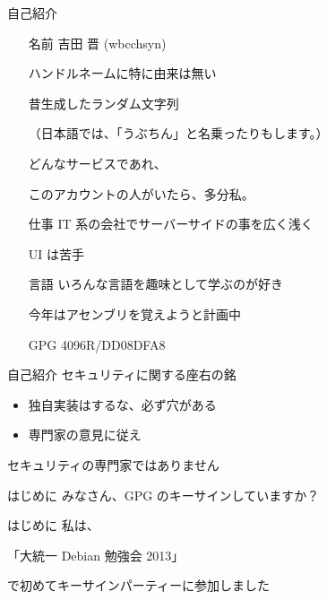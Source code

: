 
\frame{\titlepage{}}

\begin{frame}{自己紹介}{}
  \begin{itemize}
  \item[名前] 吉田 晋 (wbcchsyn)

    ハンドルネームに特に由来は無い

    昔生成したランダム文字列

    （日本語では、「うぶちん」と名乗ったりもします。）

    どんなサービスであれ、

    このアカウントの人がいたら、多分私。
  \item[仕事] IT 系の会社でサーバーサイドの事を広く浅く

    UI は苦手
  \item[言語] いろんな言語を趣味として学ぶのが好き

    今年はアセンブリを覚えようと計画中
  \item[GPG] 4096R/DD08DFA8
  \end{itemize}
\end{frame}

\begin{frame}{自己紹介}{}
  セキュリティに関する座右の銘
  \vspace{1cm}

  \begin{itemize}
  \item 独自実装はするな、必ず穴がある
  \item 専門家の意見に従え
  \end{itemize}
  \vspace{1cm}

  セキュリティの専門家ではありません
\end{frame}

\begin{frame}{はじめに}{}
  みなさん、GPG のキーサインしていますか？
\end{frame}

\begin{frame}{はじめに}{}
  私は、
  \vspace{1cm}

  「大統一 Debian 勉強会 2013」
  \vspace{1cm}

  で初めてキーサインパーティーに参加しました
\end{frame}

